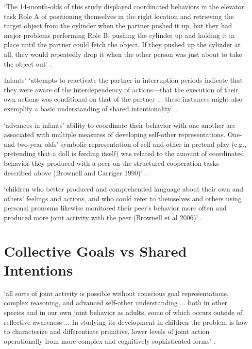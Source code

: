 \documentclass[12pt]{extarticle}
\begin{document}
\begin{multicols}{3}
‘The 14-month-olds of this study displayed coordinated behaviors in the
elevator task Role A of positioning themselves in the right location and
retrieving the target object from the cylinder when the partner pushed it
up, but they had major problems performing Role B, pushing the cylinder up
and holding it in place until the partner could fetch the object. If they
pushed up the cylinder at all, they would repeatedly drop it when the other
person was just about to take the object out’ \citep{warneken:2007_helping}.

Infants’ ‘attempts to reactivate the
partner in interruption periods indicate that they were aware of the
interdependency of actions—that the execution of their own actions was
conditional on that of the partner ... these instances might also
exemplify a basic understanding of shared intentionality’
\citep[p.~290--1]{warneken:2007_helping}.

‘advances in infants’ ability to coordinate their behavior with one another
are associated with multiple measures of developing self-other
representations. One- and two-year olds’ symbolic representation of self
and other in pretend play (e.g., pretending that a doll is feeding itself)
was related to the amount of coordinated behavior they produced with a peer
on the structured cooperation tasks described above (Brownell and Carriger
1990)’
\citep[p.~206]{brownell:2011_early}.

‘children who better produced and comprehended language about their own and
others’ feelings and actions, and who could refer to themselves and others
using personal pronouns likewise monitored their peer’s behavior more often
and produced more joint activity with the peer (Brownell et al 2006)’
\citep[p.~206]{brownell:2011_early}.



\section{Collective Goals vs Shared Intentions}

‘all sorts of joint activity is possible without conscious goal
representations, complex reasoning, and advanced self-other understanding ...
both in other species and in our own
joint behavior as adults, some of which occurs outside of reflective
awareness ...
In studying
its development in children the problem is how to characterize and
differentiate primitive, lower levels of joint action operationally from more
complex and cognitively sophisticated forms’
\citep[p.~195]{brownell:2011_early}.


\end{multicols}
\end{document}
